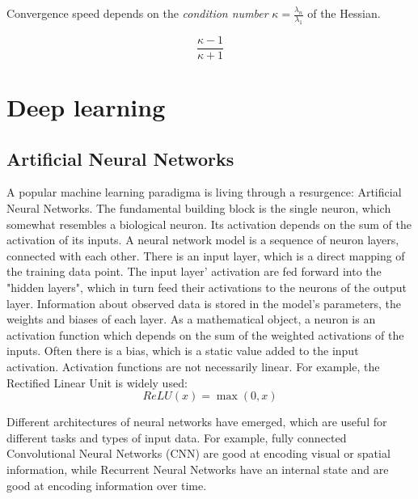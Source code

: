 \documentclass[twoside,12pt,a4paper]{report}
\begin{document}
Convergence speed depends on the \textit{condition number} $\kappa = \frac{\lambda_n}{\lambda_1}$ of the Hessian.

$$ \frac{\kappa - 1}{\kappa + 1}$$


\section{Deep learning}
\subsection{Artificial Neural Networks}
A popular machine learning paradigma is living through a resurgence: Artificial Neural Networks. The fundamental building block is the single neuron, which somewhat resembles a biological neuron. Its activation depends on the sum of the activation of its inputs. A neural network model is a sequence of neuron layers, connected with each other. There is an input layer, which is a direct mapping of the training data point. The input layer' activation are fed forward into the "hidden layers", which in turn feed their activations to the neurons of the output layer. Information about observed data is stored in the model's parameters, the weights and biases of each layer.
As a mathematical object, a neuron is an activation function which depends on the sum of the weighted activations of the inputs. Often there is a bias, which is a static value added to the input activation. Activation functions are not necessarily linear.
For example, the Rectified Linear Unit is widely used:
$$ReLU(x) = \max(0,x) $$

Different architectures of neural networks have emerged, which are useful for different tasks and types of input data. For example, fully connected Convolutional Neural Networks (CNN) are good at encoding visual or spatial information, while Recurrent Neural Networks have an internal state and are good at encoding information over time.
\end{document}
